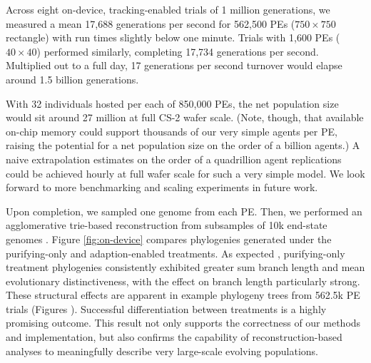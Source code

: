 Across eight on-device, tracking-enabled trials of 1 million generations, we measured a mean 17,688 generations per second for 562,500 PEs ($750\times750$ rectangle) with run times slightly below one minute.
Trials with 1,600 PEs ($40\times40$) performed similarly, completing 17,734 generations per second.
Multiplied out to a full day, 17 generations per second turnover would elapse around 1.5 billion generations.

With 32 individuals hosted per each of 850,000 PEs, the net population size would sit around 27 million at full CS-2 wafer scale.
(Note, though, that available on-chip memory could support thousands of our very simple agents per PE, raising the potential for a net population size on the order of a billion agents.)
A naive extrapolation estimates on the order of a quadrillion agent replications could be achieved hourly at full wafer scale for such a very simple model.
We look forward to more benchmarking and scaling experiments in future work.

Upon completion, we sampled one genome from each PE.
Then, we performed an agglomerative trie-based reconstruction from subsamples of 10k end-state genomes \cite{moreno2024analysis}.
Figure \ref{fig:on-device} compares phylogenies generated under the purifying-only and adaption-enabled treatments.
As expected \cite{moreno2023toward}, purifying-only treatment phylogenies consistently exhibited greater sum branch length and mean evolutionary distinctiveness, with the effect on branch length particularly strong.
These structural effects are apparent in example phylogeny trees from 562.5k PE trials (Figures ).
Successful differentiation between treatments is a highly promising outcome.
This result not only supports the correctness of our methods and implementation, but also confirms the capability of reconstruction-based analyses to meaningfully describe very large-scale evolving populations.
